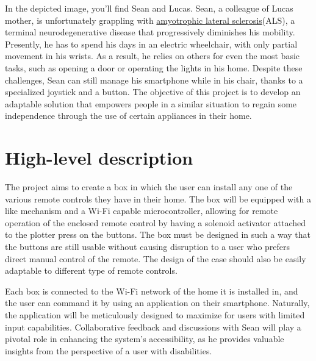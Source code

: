 \begin{minipage}[t]{0.65\textwidth}
    In the depicted image, you'll find Sean and Lucas.
    Sean, a colleague of Lucas mother, is unfortunately grappling with \href{https://en.wikipedia.org/wiki/ALS}{amyotrophic lateral sclerosis}\footnotemark (ALS), a terminal neurodegenerative disease that progressively diminishes his mobility.
    Presently, he has to spend his days in an electric wheelchair, with only partial movement in his wrists.
    As a result, he relies on others for even the most basic tasks, such as opening a door or operating the lights in his home.
    Despite these challenges, Sean can still manage his smartphone while in his chair, thanks to a specialized joystick and a button.
    The objective of this project is to develop an adaptable solution that empowers people in a similar situation to regain some independence through the use of certain appliances in their home.
\end{minipage}\hfill
\begin{minipage}[t]{0.30\textwidth}
  \centering{}
\end{minipage}

\vspace{-10pt}

\section{High-level description}

The project aims to create a box in which the user can install any one of the various remote controls they have in their home.
The box will be equipped with a  like mechanism and a Wi-Fi capable microcontroller, allowing for remote operation of the enclosed remote control by having a solenoid activator attached to the plotter press on the buttons.
The box must be designed in such a way that the buttons are still usable without causing disruption to a user who prefers direct manual control of the remote.
The design of the case should also be easily adaptable to different type of remote controls.

Each box is connected to the Wi-Fi network of the home it is installed in, and the user can command it by using an application on their smartphone.
Naturally, the application will be meticulously designed to maximize  for users with limited input capabilities.
Collaborative feedback and discussions with Sean will play a pivotal role in enhancing the system's accessibility, as he provides valuable insights from the perspective of a user with disabilities.

